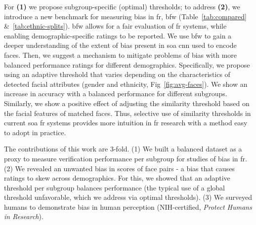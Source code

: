     
    For \textbf{(1)} we propose subgroup-specific (\ie optimal) thresholds; to address \textbf{(2)}, we introduce a new benchmark for measuring bias in \gls{fr}, \gls{bfw} (Table~\ref{tab:compared} \&~\ref{tab:ethnic-splits}). \gls{bfw} allows for a fair evaluation of \gls{fr} systems, while enabling demographic-specific ratings to be reported. We use \gls{bfw} to gain a deeper understanding of the extent of bias present in \gls{soa} \gls{cnn} used to encode faces. Then, we suggest a mechanism to mitigate problems of bias with more balanced performance ratings for different demographics. Specifically, we propose using an adaptive threshold that varies depending on the characteristics of detected facial attributes (\ie gender and ethnicity, Fig~\ref{fig:avg-faces}). We show an increase in accuracy with a balanced performance for different subgroups. Similarly, we show a positive effect of adjusting the similarity threshold based on the facial features of matched faces. Thus, selective use of similarity thresholds in current \gls{soa} \gls{fr} systems provides more intuition in \gls{fr} research with a method easy to adopt in practice. 
    
    
    The contributions of this work are 3-fold. (1) We built a balanced dataset as a proxy to measure verification performance per subgroup for studies of bias in \gls{fr}. (2) We revealed an unwanted bias in scores of face pairs - a bias that causes ratings to skew across demographics. For this, we showed that an adaptive threshold per subgroup balances performance (\ie the typical use of a global threshold unfavorable, which we address via optimal thresholds). (3) We surveyed humans to demonstrate bias in human perception (NIH-certified, \textit{Protect Humans in Research}).%

